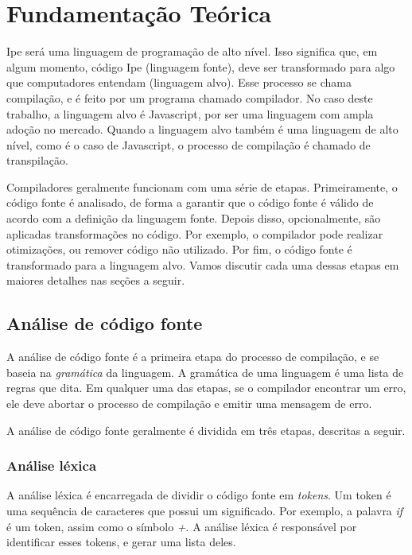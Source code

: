 
\chapter{Fundamentação Teórica}

Ipe será uma linguagem de programação de alto nível. Isso significa que, em algum
momento, código Ipe (linguagem fonte), deve ser transformado para algo que
computadores entendam (linguagem alvo). Esse processo se chama compilação, e é
feito por um programa chamado compilador. No caso deste trabalho, a linguagem
alvo é Javascript, por ser uma linguagem com ampla adoção no mercado. Quando a
linguagem alvo também é uma linguagem de alto nível, como é o caso de Javascript,
o processo de compilação é chamado de transpilação.

Compiladores geralmente funcionam com uma série de etapas. Primeiramente, o
código fonte é analisado, de forma a garantir que o código fonte é válido de
acordo com a definição da linguagem fonte. Depois disso, opcionalmente, são
aplicadas transformações no código. Por exemplo, o compilador pode realizar
otimizações, ou remover código não utilizado. Por fim, o código fonte é
transformado para a linguagem alvo. Vamos discutir cada uma dessas etapas em
maiores detalhes nas seções a seguir.

\section{Análise de código fonte}

A análise de código fonte é a primeira etapa do processo de compilação, e se
baseia na \textit{gramática} da linguagem. A gramática de uma linguagem é uma lista
de regras que dita. Em qualquer uma das etapas, se o compilador encontrar um erro,
ele deve abortar o processo de compilação e emitir uma mensagem de erro.

A análise de código fonte geralmente é dividida em três etapas, descritas a seguir.

\subsection{Análise léxica}

A análise léxica é encarregada de dividir o código fonte em \textit{tokens}. Um
token é uma sequência de caracteres que possui um significado. Por exemplo, a
palavra \textit{if} é um token, assim como o símbolo \textit{+}. A análise léxica
é responsável por identificar esses tokens, e gerar uma lista deles.


